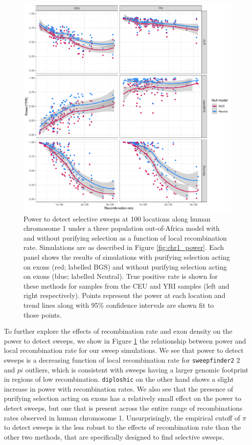 \documentclass[hidelinks]{article}
\newcommand{\sweepfinder}{\texttt{sweepfinder2}\xspace}
\newcommand{\diploshic}{\texttt{diploshic}\xspace}
\begin{document}
    \begin{figure}
        \centering
        \includegraphics[width=0.8 \textwidth]{figures/sweeps/relationship_power_cM.pdf}
        \caption{
        Power to detect selective sweeps at 100 locations along human chromosome 1 under a three population out-of-Africa model \citep{gutenkunst2009inferring}  
        with and without purifying selection as a function of local recombination rate.
        Simulations are as described in Figure \ref{fig:chr1_power}.
        Each panel shows the results of simulations with purifying selection acting on exons (red; labelled BGS)
        and without purifying selection acting on exons (blue; labelled Neutral).
        True positive rate is shown for these methods for samples from the CEU and YRI samples (left and right respectively).
        Points represent the power at each location and trend lines along with 95\% confidence intervals are shown fit to those points.
        }
        \label{fig:power-recomb}
    \end{figure}

    To further explore the effects of recombination rate and exon density on the power to detect sweeps, we show in Figure \ref{fig:power-recomb}
    the relationship between power and local recombination rate for our sweep simulations. We see that power to detect sweeps is
    a decreasing function of local recombination rate for \sweepfinder2 and $pi$ outliers,
    which is consistent with sweeps having a larger genomic footprint in regions of low
    recombination.
    \diploshic on the other hand shows a slight increase in power with recombination rates.
    We also see that the presence of purifying selection acting on exons has a relatively small effect on the power to detect sweeps,    
    but one that is present across the entire range of recombinations rates observed in human chromosome 1. 
    Unsurprisingly, the empirical cutoff of $\pi$ to detect sweeps is the less robust to the effects of recombination rate than the other two methods,
    that are specifically designed to find selective sweeps. 
\end{document}
